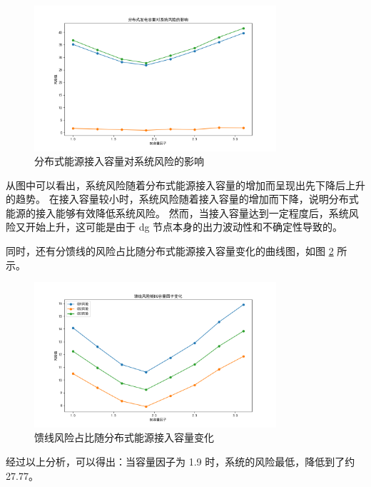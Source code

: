 \documentclass{article}
\begin{document}
\begin{figure}[H]
  \centering
  \includegraphics[width=0.8\textwidth]{problem2/dg_capacity_trending.png}
  \caption{分布式能源接入容量对系统风险的影响}
  \label{fig:risk_evolution}
\end{figure}

从图中可以看出，系统风险随着分布式能源接入容量的增加而呈现出先下降后上升的趋势。
在接入容量较小时，系统风险随着接入容量的增加而下降，说明分布式能源的接入能够有效降低系统风险。
然而，当接入容量达到一定程度后，系统风险又开始上升，这可能是由于 dg 节点本身的出力波动性和不确定性导致的。

同时，还有分馈线的风险占比随分布式能源接入容量变化的曲线图，如图 \ref{fig:line_risk_evolution} 所示。

\begin{figure}[H]
  \centering
  \includegraphics[width=0.8\textwidth]{problem2/dg_capacity_trending_feeder.png}
  \caption{馈线风险占比随分布式能源接入容量变化}
  \label{fig:line_risk_evolution}
\end{figure}

经过以上分析，可以得出：当容量因子为 1.9 时，系统的风险最低，降低到了约 27.77。

\end{document}
